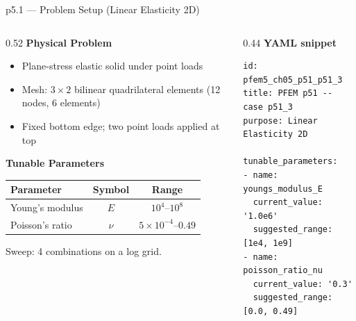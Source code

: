 \documentclass[aspectratio=169]{beamer}
\begin{document}
\begin{frame}[fragile,shrink=5]{p5.1 --- Problem Setup (Linear Elasticity 2D)}
    \begin{columns}[t]
        \begin{column}{0.52\textwidth}
            \textbf{Physical Problem}
            \begin{itemize}
                \setlength\itemsep{0.3em}
                \item Plane-stress elastic solid under point loads
                \item Mesh: $3 \times 2$ bilinear quadrilateral elements (12 nodes, 6 elements)
                \item Fixed bottom edge; two point loads applied at top
            \end{itemize}

            \vspace{0.2cm}
            \textbf{Tunable Parameters}
            \begin{center}
            \small
            \begin{tabular}{lcc}
                \toprule
                Parameter & Symbol & Range \\
                \midrule
                Young's modulus & $E$ & $10^4$--$10^8$ \\
                Poisson's ratio & $\nu$ & $5{\times}10^{-4}$--$0.49$ \\
                \bottomrule
            \end{tabular}
            \end{center}
            \vspace{0.1cm}
            {\small Sweep: 4 combinations on a log grid.}
        \end{column}
        \begin{column}{0.44\textwidth}
            \textbf{YAML snippet}
            \begin{lstlisting}[language={}, basicstyle=\ttfamily\tiny, numbers=none, frame=single]
id: pfem5_ch05_p51_p51_3
title: PFEM p51 -- case p51_3
purpose: Linear Elasticity 2D

tunable_parameters:
- name: youngs_modulus_E
  current_value: '1.0e6'
  suggested_range: [1e4, 1e9]
- name: poisson_ratio_nu
  current_value: '0.3'
  suggested_range: [0.0, 0.49]
            \end{lstlisting}
        \end{column}
    \end{columns}
\end{frame}
\end{document}
